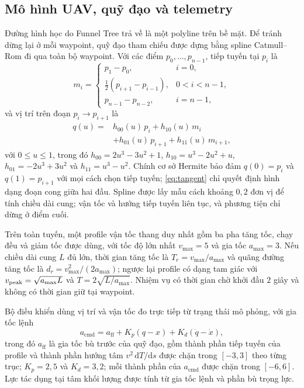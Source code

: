 \subsection{Mô hình UAV, quỹ đạo và telemetry}\label{sec:trajectory}

Đường hình học do Funnel Tree trả về là một polyline trên bề mặt. Để tránh dừng
lại ở mỗi waypoint, quỹ đạo tham chiếu được dựng bằng spline Catmull--Rom đi qua
toàn bộ waypoint. Với các điểm $p_0,\ldots,p_{n-1}$, tiếp tuyến tại $p_i$ là
\begin{equation}
  m_i=
  \begin{cases}
    p_1-p_0, & i=0,\\
    \tfrac12\left(p_{i+1}-p_{i-1}\right), & 0<i<n-1,\\
    p_{n-1}-p_{n-2}, & i=n-1,
  \end{cases}
  \label{eq:tangent}
\end{equation}
và vị trí trên đoạn $p_i\to p_{i+1}$ là
\begin{equation}
  \begin{split}
    q(u)={}&h_{00}(u)\,p_i+h_{10}(u)\,m_i\\
         &+h_{01}(u)\,p_{i+1}+h_{11}(u)\,m_{i+1},
  \end{split}
  \label{eq:catmullrom}
\end{equation}
với $0\le u\le 1$, trong đó $h_{00}=2u^3-3u^2+1$,
$h_{10}=u^3-2u^2+u$, $h_{01}=-2u^3+3u^2$ và $h_{11}=u^3-u^2$. Chính cơ sở
Hermite bảo đảm $q(0)=p_i$ và $q(1)=p_{i+1}$ với mọi cách chọn tiếp tuyến;
\eqref{eq:tangent} chỉ quyết định hình dạng đoạn cong giữa hai đầu. Spline được
lấy mẫu cách khoảng $0{,}2$ đơn vị để tính chiều dài cung; vận tốc và hướng tiếp
tuyến liên tục, và phương tiện chỉ dừng ở điểm cuối.

Trên toàn tuyến, một profile vận tốc thang duy nhất gồm ba pha tăng tốc, chạy đều
và giảm tốc được dùng, với tốc độ lớn nhất $v_{\max}=5$ và gia tốc
$a_{\max}=3$. Nếu chiều dài cung $L$ đủ lớn, thời gian tăng tốc là
$T_r=v_{\max}/a_{\max}$ và quãng đường tăng tốc là
$d_r=v_{\max}^2/(2a_{\max})$; ngược lại profile có dạng tam giác với
$v_{\rm peak}=\sqrt{a_{\max}L}$ và $T=2\sqrt{L/a_{\max}}$. Nhiệm vụ có thời gian
chờ khởi đầu $2$ giây và không có thời gian giữ tại waypoint.

Bộ điều khiển dùng vị trí và vận tốc đo trực tiếp từ trạng thái mô phỏng, với
gia tốc lệnh
\begin{equation}
  a_{\mathrm{cmd}}=a_{\mathrm{ff}}+K_p(q-x)+K_d(\dot q-\dot x),
  \label{eq:control}
\end{equation}
trong đó $a_{\mathrm{ff}}$ là gia tốc bù trước của quỹ đạo, gồm thành phần tiếp
tuyến của profile và thành phần hướng tâm $v^2\,\mathrm{d}T/\mathrm{d}s$ được chặn
trong $[-3,3]$ theo từng trục; $K_p=2{,}5$ và $K_d=3{,}2$; mỗi thành phần của
$a_{\mathrm{cmd}}$ được chặn trong $[-6,6]$. Lực tác dụng tại tâm khối lượng được
tính từ gia tốc lệnh và phần bù trọng lực.

